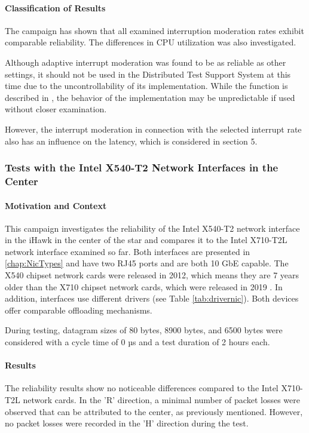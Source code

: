\paragraph{Classification of Results}
The campaign has shown that all examined interruption moderation rates exhibit comparable reliability. The differences in CPU utilization was also investigated.

Although adaptive interrupt moderation was found to be as reliable as other settings, it should not be used in the Distributed Test Support System at this time due to the uncontrollability of its implementation. While the function is described in \cite{intermod04}, the behavior of the implementation may be unpredictable if used without closer examination.

However, the interrupt moderation in connection with the selected interrupt rate also has an influence on the latency, which is considered in section 5. %

\subsubsection{Tests with the Intel X540-T2 Network Interfaces in the Center} \label{chap:IntelRel540}
\paragraph{Motivation and Context}
This campaign investigates the reliability of the Intel X540-T2 network interface in the iHawk in the center of the star and compares it to the Intel X710-T2L network interface examined so far. Both interfaces are presented in \ref{chap:NicTypes} and have two RJ45 ports and are both 10 GbE capable. The X540 chipset network cards were released in 2012, which means they are 7 years older than the X710 chipset network cards, which were released in 2019 \cite{setupnw02, setupnw03}. In addition, interfaces use different drivers (see Table \ref{tab:drivernic}). Both devices offer comparable offloading mechanisms.

During testing, datagram sizes of 80 bytes, 8900 bytes, and 6500 bytes were considered with a cycle time of 0 µs and a test duration of 2 hours each.

\paragraph{Results}
The reliability results show no noticeable differences compared to the Intel X710-T2L network cards. In the 'R' direction, a minimal number of packet losses were observed that can be attributed to the center, as previously mentioned. However, no packet losses were recorded in the 'H' direction during the test.

